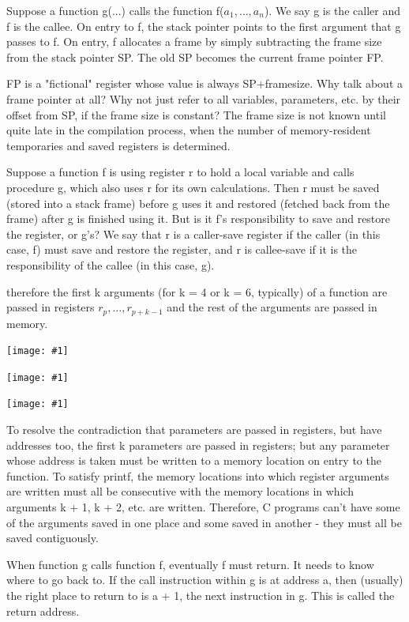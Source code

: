 \documentclass[8pt, a4paper, oneside, twocolumn]{extarticle}
\newcommand{\ph}[1]{
    \texttt{[image: \#1]}
}
\begin{document}
Suppose a function g(...) calls the function f($a_1, \dots , a_n$). We say g is the
caller and f is the callee.
On entry to f, the stack pointer points to the first
argument that g passes to f. On entry, f allocates a frame by simply 
subtracting the frame size from the stack pointer SP. The old SP becomes the current frame pointer FP.

FP is a
"fictional" register whose value is always SP+framesize.
Why talk about a frame pointer at all? Why not just refer to all variables,
parameters, etc. by their offset from SP, if the frame size is constant? The
frame size is not known until quite late in the compilation process, when the
number of memory-resident temporaries and saved registers is determined.

Suppose a function f is using register r to hold a local variable and calls procedure g, which also uses r for
its own calculations. Then r must be saved (stored into a stack frame) before
g uses it and restored (fetched back from the frame) after g is finished using
it. But is it f's responsibility to save and restore the register, or g's? We say
that r is a caller-save register if the caller (in this case, f) must save and 
restore the register, and r is callee-save if it is the responsibility of the callee
(in this case, g).

therefore the
first k arguments (for k = 4 or k = 6, typically) of a function are passed in
registers $r_p, \dots, r_{p+k - 1}$ and the rest of the arguments are passed in memory.

\ph{r9}

\ph{r10}

\ph{r11}

To resolve the contradiction that
parameters are passed in registers, but have addresses too, the first k 
parameters are passed in registers; but any parameter whose address is taken must
be written to a memory location on entry to the function. To satisfy printf,
the memory locations into which register arguments are written must all be
consecutive with the memory locations in which arguments k + 1, k + 2, etc.
are written. Therefore, C programs can't have some of the arguments saved
in one place and some saved in another - they must all be saved contiguously.

When function g calls function f, eventually f must return. It needs to know
where to go back to. If the call instruction within g is at address a, then
(usually) the right place to return to is a + 1, the next instruction in g. This is
called the return address.
\end{document}
